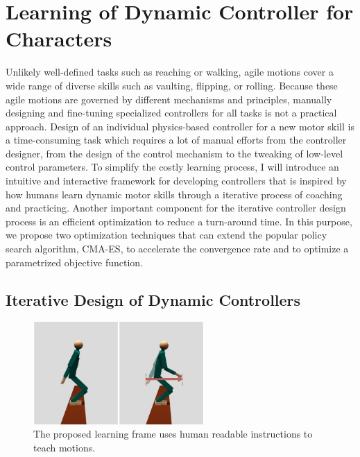 \section{Learning of Dynamic Controller for Characters}
Unlikely well-defined tasks such as reaching or walking,
agile motions cover a wide range of diverse skills such as vaulting, flipping,
or rolling.
Because these agile motions are governed by different mechanisms and
principles, manually designing and fine-tuning specialized controllers for all
tasks is not a practical approach.
Design of an individual physics-based controller for a new motor skill is 
a time-consuming task  which requires a lot of manual efforts from the controller
designer, from the design of the control mechanism to the tweaking of low-level
control parameters. 
To simplify the costly learning process, I will introduce an intuitive and 
interactive framework for developing controllers that is inspired by
how humans learn dynamic motor skills through a iterative process of coaching
and practicing.
Another important component for the iterative controller design process
is an efficient optimization to reduce a turn-around time.
In this purpose, we propose two optimization techniques that can extend the
popular policy search algorithm, CMA-ES, to accelerate the convergence rate
and to optimize a parametrized objective function.

\subsection{Iterative Design of Dynamic Controllers}
\begin{figure}
 \vspace{-10pt}
  \begin{center}
    \includegraphics[width=0.58\textwidth]{images/intro_teach.png}
  \end{center}
   \vspace{-25pt}
  \caption{The proposed learning frame uses human readable instructions
    to teach motions.}
  \label{fig:intro_teach}
   \vspace{-10pt}
\end{figure}

